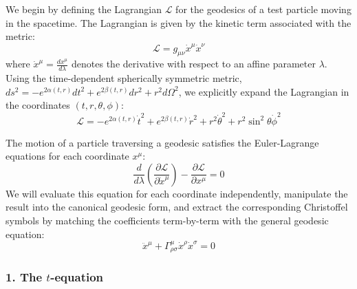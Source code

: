 \documentclass[11pt, a4paper]{report}
\begin{document}
We begin by defining the Lagrangian $\mathcal{L}$ for the geodesics of a test particle moving in the spacetime. The Lagrangian is given by the kinetic term associated with the metric:
\begin{equation}
    \mathcal{L} = g_{\mu\nu} \dot{x}^\mu \dot{x}^\nu
\end{equation}
where $\dot{x}^\mu = \frac{dx^\mu}{d\lambda}$ denotes the derivative with respect to an affine parameter $\lambda$. Using the time-dependent spherically symmetric metric, $ds^2 = -e^{2\alpha(t,r)} dt^2 + e^{2\beta(t,r)} dr^2 + r^2 d\Omega^2$, we explicitly expand the Lagrangian in the coordinates $(t, r, \theta, \phi)$:
\begin{equation}
    \mathcal{L} = -e^{2\alpha(t,r)} \dot{t}^2 + e^{2\beta(t,r)} \dot{r}^2 + r^2 \dot{\theta}^2 + r^2 \sin^2\theta \dot{\phi}^2
\end{equation}

The motion of a particle traversing a geodesic satisfies the Euler-Lagrange equations for each coordinate $x^\mu$:
\begin{equation}
    \frac{d}{d\lambda} \left( \frac{\partial \mathcal{L}}{\partial \dot{x}^\mu} \right) - \frac{\partial \mathcal{L}}{\partial x^\mu} = 0 \label{eq:EL_general}
\end{equation}
We will evaluate this equation for each coordinate independently, manipulate the result into the canonical geodesic form, and extract the corresponding Christoffel symbols by matching the coefficients term-by-term with the general geodesic equation:
\begin{equation}
    \ddot{x}^\mu + \Gamma^\mu_{\rho\sigma} \dot{x}^\rho \dot{x}^\sigma = 0 \label{eq:geodesic_general}
\end{equation}
\subsubsection*{1. The $t$-equation}
\end{document}

